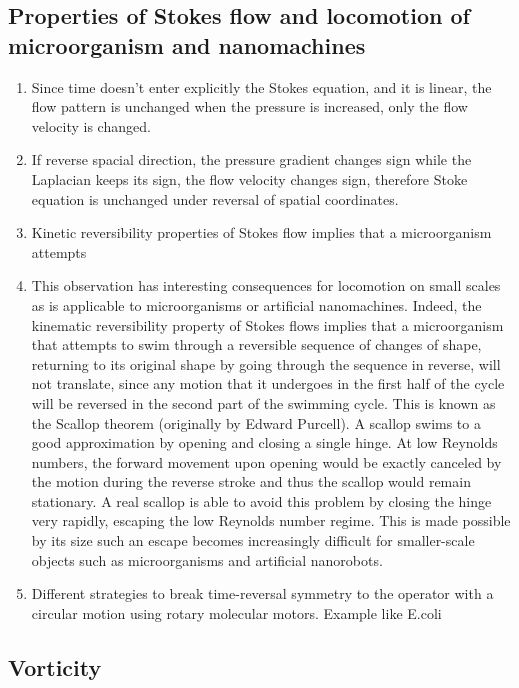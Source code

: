 \documentclass[12pt,a4paper]{article}
\begin{document}
        \subsection{Properties of Stokes flow and locomotion of microorganism and nanomachines}
            \begin{enumerate}
                \item Since time doesn't enter explicitly the Stokes equation, and it is linear, the flow pattern is unchanged when the pressure is increased, only the flow velocity is changed.
                \item If reverse spacial direction, the pressure gradient changes sign while the Laplacian keeps its sign, the flow velocity changes sign, therefore Stoke equation is unchanged under reversal of spatial coordinates.
                \item Kinetic reversibility properties of Stokes flow implies that a microorganism attempts
                \item This observation has interesting consequences for locomotion on small scales as is applicable to microorganisms or artificial nanomachines. 
                Indeed, the kinematic reversibility property of Stokes flows implies that a microorganism that attempts to swim through a reversible sequence of changes of shape, returning to its original shape by going through the sequence in reverse, will not translate, since any motion that it undergoes in the first half of the cycle will be reversed in the second part of the swimming cycle. 
                This is known as the Scallop theorem (originally by Edward Purcell). 
                A scallop swims to a good approximation by opening and closing a single hinge. 
                At low Reynolds numbers, the forward movement upon opening would be exactly canceled by the motion during the reverse stroke and thus the scallop would remain stationary. 
                A real scallop is able to avoid this problem by closing the hinge very rapidly, escaping the low Reynolds number regime. 
                This is made possible by its size such an escape becomes increasingly difficult for smaller-scale objects such as microorganisms and artificial nanorobots.
                \item Different strategies to break time-reversal symmetry to the operator with a circular motion using rotary molecular motors. Example like E.coli
            \end{enumerate}
        \subsection{Vorticity}
\end{document}
